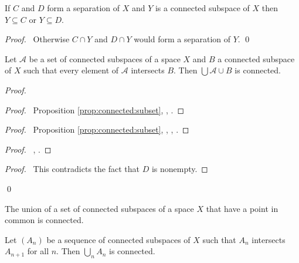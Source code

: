 \begin{prop}
  \label{prop:connected:subset}
  If $C$ and $D$ form a separation of $X$ and $Y$ is a connected subspace of $X$ then $Y \subseteq C$ or $Y \subseteq D$.
\end{prop}

\begin{proof}
  \pf\ Otherwise $C \cap Y$ and $D \cap Y$ would form a separation of $Y$. \qed
\end{proof}

\begin{prop}
  Let $\mathcal{A}$ be a set of connected subspaces of a space $X$ and $B$ a connected subspace of $X$ such that every element of $\mathcal{A}$ intersects $B$. Then $\bigcup \mathcal{A} \cup B$ is connected.
\end{prop}

\begin{proof}
  \pf
  \begin{proof}
    \pf\ Proposition \ref{prop:connected:subset}, , .
  \end{proof}
  \begin{proof}
    \pf\ Proposition \ref{prop:connected:subset}, , , .
  \end{proof}
  \begin{proof}
    \pf\ , .
  \end{proof}
  \qedstep
  \begin{proof}
    \pf\ This contradicts the fact that $D$ is nonempty.
  \end{proof}
  \qed
\end{proof}

\begin{cor}
  \label{cor:connected:union}
  The union of a set of connected subspaces of a space $X$ that have a point in common is connected.
\end{cor}

\begin{prop}
  Let $(A_n)$ be a sequence of connected subspaces of $X$ such that $A_n$ intersects $A_{n+1}$ for all $n$. Then $\bigcup_n A_n$ is connected.
\end{prop}

